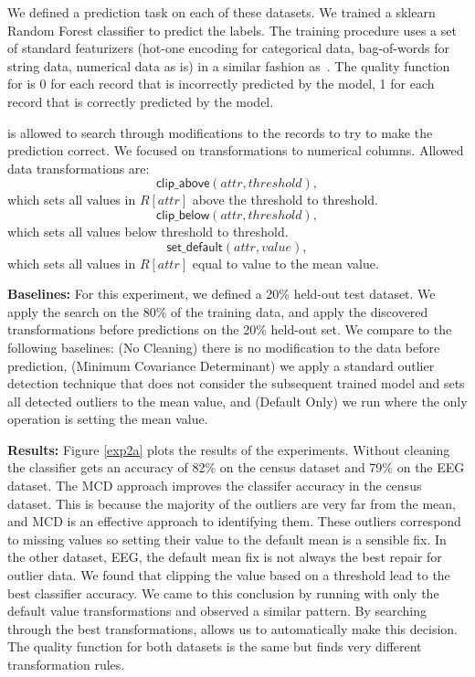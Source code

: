 \vspace{0.5em}
We defined a prediction task on each of these datasets. We trained a \textsf{sklearn} Random Forest classifier to predict the labels. The training procedure uses a set of standard featurizers (hot-one encoding for categorical data, bag-of-words for string data, numerical data as is) in a similar fashion as~\cite{gokhale2014corleone}. The quality function for \sys is 0 for each record that is incorrectly predicted by the model, 1 for each record that is correctly predicted by the model.

\sys is allowed to search through modifications to the records to try to make the prediction correct. We focused on transformations to numerical columns. Allowed data transformations are:
\[
\textsf{clip\_above}(attr, threshold), 
\]
which sets all values in $R[attr]$ above the threshold to threshold.
\[
\textsf{clip\_below}(attr, threshold), 
\]
which sets all values below threshold to threshold.
\[
\textsf{set\_default}(attr, value), 
\]
which sets all values in $R[attr]$ equal to value to the mean value.

\vspace{0.5em}\noindent\textbf{Baselines: } For this experiment, we defined a 20\% held-out test dataset. We apply the search on the 80\% of the training data, and apply the discovered transformations before predictions on the 20\% held-out set. 
We compare to the following baselines: (No Cleaning) there is no modification to the data before prediction, (Minimum Covariance Determinant) we apply a standard outlier detection technique that does not consider the subsequent trained model and sets all detected outliers to the mean value, and (Default Only) we run \sys where the only operation is setting the mean value.

\vspace{0.5em}\noindent\textbf{Results: } Figure \ref{exp2a} plots the results of the experiments. Without cleaning the classifier gets an accuracy of 82\% on the census dataset and 79\% on the EEG dataset. The MCD approach improves the classifer accuracy in the census dataset. This is because the majority of the outliers are very far from the mean, and MCD is an effective approach to identifying them. These outliers correspond to missing values so setting their value to the default mean is a sensible fix.
In the other dataset, EEG, the default mean fix is not always the best repair for outlier data. 
We found that clipping the value based on a threshold lead to the best classifier accuracy.
We came to this conclusion by running \sys with only the default value transformations and observed a similar pattern. 
By searching through the best transformations, \sys allows us to automatically make this decision.
The quality function for both datasets is the same but \sys finds very different transformation rules.

